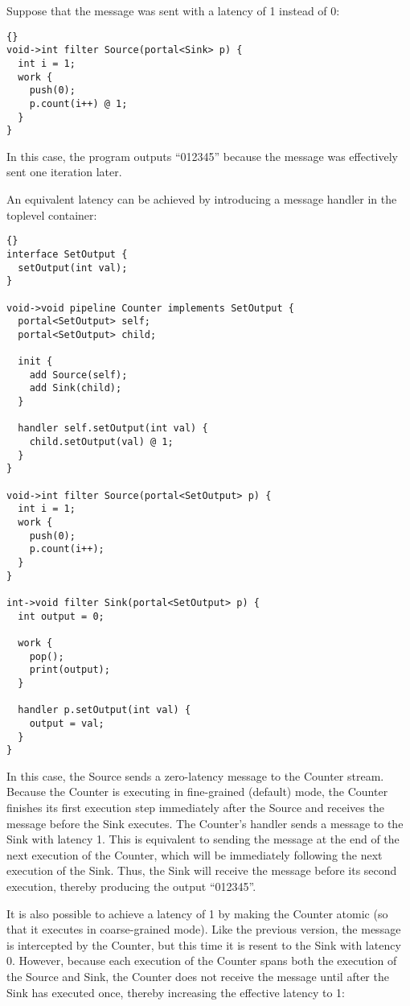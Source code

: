 Suppose that the message was sent with a latency of 1 instead of 0:

\begin{lstlisting}{}
void->int filter Source(portal<Sink> p) {
  int i = 1;
  work {
    push(0);
    p.count(i++) @ 1;
  }
}
\end{lstlisting}{}

In this case, the program outputs ``012345'' because the message was
effectively sent one iteration later.

An equivalent latency can be achieved by introducing a message handler
in the toplevel container:

\begin{lstlisting}{}
interface SetOutput {
  setOutput(int val);
}

void->void pipeline Counter implements SetOutput {
  portal<SetOutput> self;
  portal<SetOutput> child;

  init {
    add Source(self);
    add Sink(child);
  }

  handler self.setOutput(int val) {
    child.setOutput(val) @ 1;
  }
}

void->int filter Source(portal<SetOutput> p) {
  int i = 1;
  work {
    push(0);
    p.count(i++);
  }
}

int->void filter Sink(portal<SetOutput> p) {
  int output = 0;

  work {
    pop();
    print(output);
  }

  handler p.setOutput(int val) {
    output = val;
  }
}
\end{lstlisting}{}

In this case, the Source sends a zero-latency message to the Counter
stream.  Because the Counter is executing in fine-grained (default)
mode, the Counter finishes its first execution step immediately after
the Source and receives the message before the Sink executes.  The
Counter's handler sends a message to the Sink with latency 1.  This is
equivalent to sending the message at the end of the next execution of
the Counter, which will be immediately following the next execution of
the Sink.  Thus, the Sink will receive the message before its second
execution, thereby producing the output ``012345''.

It is also possible to achieve a latency of 1 by making the Counter
atomic (so that it executes in coarse-grained mode).  Like the
previous version, the message is intercepted by the Counter, but this
time it is resent to the Sink with latency 0.  However, because each
execution of the Counter spans both the execution of the Source and
Sink, the Counter does not receive the message until after the Sink
has executed once, thereby increasing the effective latency to 1:

